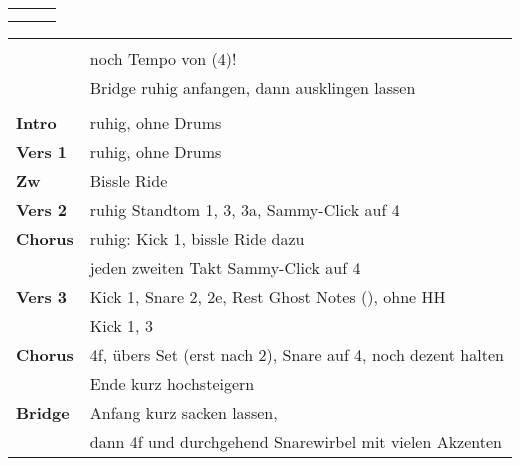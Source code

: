 

\begin{tabular}{p{0.6cm}p{12cm}p{1.4cm}}
	\rowcolor{cyan} \myRow{\thesongnumber} & \myRow{Gotteslamm} & \myRow{70} \\
	                                       &                    &            \\
\end{tabular}

\begin{tabular}{p{1.6cm}l}
	                &                                                               \\
	                & \color{red} noch Tempo von (4)!                               \\
	                & Bridge ruhig anfangen, dann ausklingen lassen                 \\
	                &                                                               \\
	\textbf{Intro}  & ruhig, ohne Drums                                             \\
	\textbf{Vers 1} & ruhig, ohne Drums                                             \\
	\textbf{Zw}     & Bissle Ride                                                   \\
	\textbf{Vers 2} & ruhig Standtom 1, 3, 3a, Sammy-Click auf 4                    \\
	\textbf{Chorus} & ruhig: Kick 1, bissle Ride dazu                               \\
	                & jeden zweiten Takt Sammy-Click auf 4                          \\
	\textbf{Vers 3} & Kick 1, Snare 2, 2e, Rest Ghost Notes (\sechzehntel), ohne HH \\
	                & Kick 1, 3                                                     \\
	\textbf{Chorus} & 4f, übers Set (erst nach 2), Snare auf 4, noch dezent halten  \\
	                & Ende kurz \achtel hochsteigern                                \\
	\textbf{Bridge} & Anfang kurz sacken lassen,                                    \\ %
	                & dann 4f und durchgehend Snarewirbel mit vielen Akzenten       \\ %

\end{tabular}
